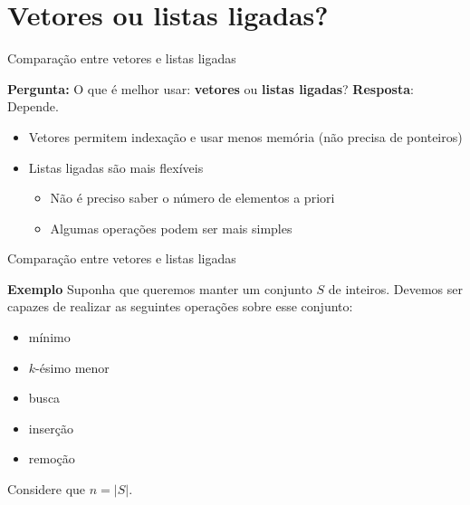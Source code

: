 \documentclass{beamer}
\begin{document}
\section{Vetores ou listas ligadas?}

\begin{frame}[fragile]{Comparação entre vetores e listas ligadas}

    \textbf{Pergunta:} O que é melhor usar: \textbf{vetores} ou \textbf{listas ligadas}?
    \textbf{Resposta}: Depende.
    \begin{itemize}
        \item Vetores permitem indexação e usar menos memória (não precisa de ponteiros)
        \item Listas ligadas são mais flexíveis
        \begin{itemize}
            \item Não é preciso saber o número de elementos a priori
            \item Algumas operações podem ser mais simples
        \end{itemize}
    \end{itemize}

\end{frame}

\begin{frame}[fragile]{Comparação entre vetores e listas ligadas}

    \textbf{Exemplo} Suponha que queremos manter um conjunto $S$ de inteiros.
    Devemos ser capazes de realizar as seguintes operações sobre esse conjunto:

    \begin{itemize}
        \item mínimo
        \item $k$-ésimo menor
        \item busca
        \item inserção
        \item remoção
    \end{itemize}

    Considere que $n = |S|$.
\end{frame}
\end{document}

